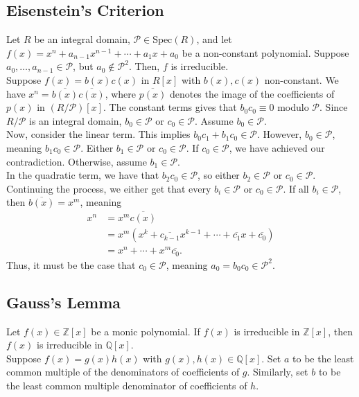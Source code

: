 \documentclass[8pt]{extarticle}
\newcommand{\Q}{\mathbb{Q}}
\newcommand{\Z}{\mathbb{Z}}
\begin{document}
  \subsection{Eisenstein's Criterion}%
  Let $R$ be an integral domain, $\mathcal{P}\in \text{Spec}(R)$, and let $f(x) = x^n + a_{n-1}x^{n-1} + \cdots + a_1x + a_0$ be a non-constant polynomial. Suppose $a_0,\dots,a_{n-1}\in \mathcal{P}$, but $a_0\notin \mathcal{P}^2$. Then, $f$ is irreducible.\\

  Suppose $f(x) = b(x)c(x)$ in $R[x]$ with $b(x),c(x)$ non-constant. We have $x^n = \overline{b(x)}\overline{c(x)}$, where $\overline{p(x)}$ denotes the image of the coefficients of $p(x)$ in $(R/\mathcal{P})[x]$. The constant terms gives that $b_0c_0 \equiv 0 $ modulo $\mathcal{P}$. Since $R/\mathcal{P}$ is an integral domain, $b_0\in \mathcal{P}$ or $c_0\in \mathcal{P}$. Assume $b_0\in\mathcal{P}$.\\

  Now, consider the linear term. This implies $b_0c_1 + b_1c_0 \in \mathcal{P}$. However, $b_0\in \mathcal{P}$, meaning $b_1c_0\in \mathcal{P}$. Either $b_1\in \mathcal{P}$ or $c_0\in \mathcal{P}$. If $c_0\in \mathcal{P}$, we have achieved our contradiction. Otherwise, assume $b_1\in \mathcal{P}$.\\

  In the quadratic term, we have that $b_2c_0\in \mathcal{P}$, so either $b_2\in \mathcal{P}$ or $c_0\in \mathcal{P}$. Continuing the process, we either get that every $b_i\in \mathcal{P}$ or $c_0\in \mathcal{P}$. If all $b_i\in \mathcal{P}$, then $\overline{b(x)} = x^m$, meaning 
  \begin{align*}
    x^n &= x^m\overline{c(x)}\\
        &= x^m \left(x^k + \overline{c_{k-1}} x^{k-1} + \cdots + \overline{c_1}x + \overline{c_0}\right)\\
        &= x^n + \cdots + x^m \overline{c_0}.
  \end{align*}
  Thus, it must be the case that $c_0\in \mathcal{P}$, meaning $a_0 = b_0c_0 \in \mathcal{P}^2$.
  \subsection{Gauss's Lemma}%
  Let $f(x) \in \Z[x]$ be a monic polynomial. If $f(x)$ is irreducible in $\Z[x]$, then $f(x)$ is irreducible in $\Q[x]$.\\

  Suppose $f(x) = g(x)h(x)$ with $g(x),h(x)\in \Q[x]$. Set $a$ to be the least common multiple of the denominators of coefficients of $g$. Similarly, set $b$ to be the least common multiple denominator of coefficients of $h$.\\
\end{document}
